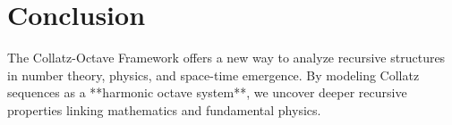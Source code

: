 \documentclass[a4paper,12pt]{article}
\begin{document}
\section{Conclusion}
The Collatz-Octave Framework offers a new way to analyze recursive structures in number theory, physics, and space-time emergence. By modeling Collatz sequences as a **harmonic octave system**, we uncover deeper recursive properties linking mathematics and fundamental physics.
\end{document}
